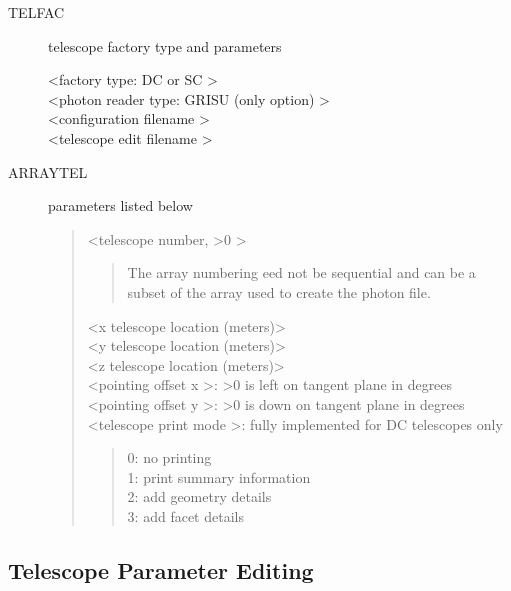 \documentclass{article}
\begin{document}
\begin{description}
\item[TELFAC] telescope factory type and parameters

\textless factory type: DC or SC \textgreater \\
\textless photon reader type: GRISU (only option) \textgreater \\
 \textless configuration filename \textgreater \\
\textless telescope edit filename \textgreater \\ 

\item[ARRAYTEL] parameters listed below
  \begin{quote}
    \textless telescope number, \textgreater $0$ \textgreater
    \begin{quote}
      The array numbering eed not be sequential and can be a subset of the 
      array used to create the photon file.
    \end{quote}      
    \textless x telescope location (meters)\textgreater \\
    \textless y telescope location (meters)\textgreater  \\
    \textless z telescope location (meters)\textgreater  \\
    \textless pointing offset x \textgreater : \textgreater $0$ is left on tangent plane in degrees \\
    \textless pointing offset y \textgreater : \textgreater $0$ is down on tangent plane in degrees \\
    \textless telescope print mode \textgreater : fully implemented for DC telescopes only 
    \begin{quote}
     0:  no printing \\
     1:  print summary information \\
     2:  add geometry details \\
     3:  add facet details \\   
    \end{quote}      
  \end{quote}

\end{description}






\subsection{Telescope Parameter Editing}\label{SSS:TEDIT}
\end{document}
